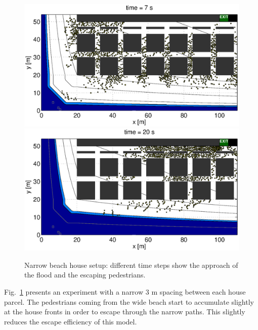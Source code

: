 \documentclass[11pt]{article}
\begin{document}
\begin{figure}
	\centering
	\includegraphics[width=1.1\textwidth]{figures/BeachEvacuationOneExitStreetWidth3_Flood0_1_000700.eps}
	\qquad
	\includegraphics[width=1.1\textwidth]{figures/BeachEvacuationOneExitStreetWidth3_Flood0_1_002000.eps}
	\caption{Narrow beach house setup: different time steps show the approach of the flood and the escaping pedestrians.}
	\label{fig:beach_3}
\end{figure}

Fig.~\ref{fig:beach_3} presents an experiment with a narrow 3 m spacing between each house parcel. The pedestrians coming from the wide beach start to accumulate slightly at the house fronts in order to escape through the narrow paths. This slightly reduces the escape efficiency of this model.
\end{document}
